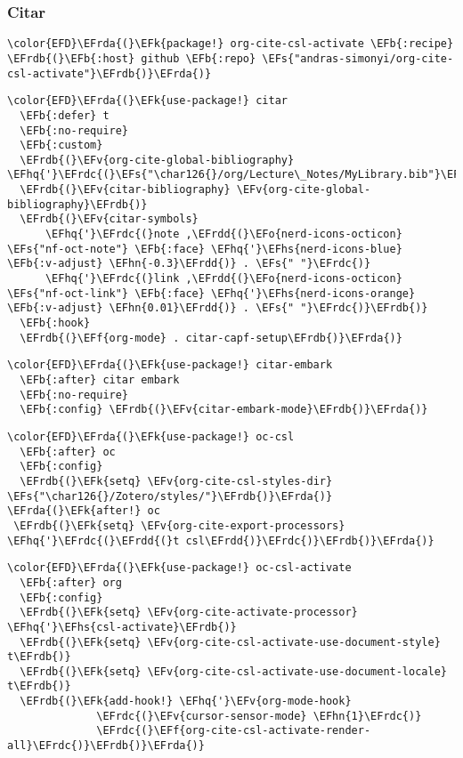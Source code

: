 \documentclass[12pt]{article}
\theoremstyle{plain}%
\theoremstyle{definition}
\theoremstyle{remark}
\newcommand{\EFs}[1]{\textcolor{EFs}{#1}} %
\newcommand{\EFk}[1]{\textcolor{EFk}{#1}} %
\newcommand{\EFb}[1]{\textcolor{EFb}{#1}} %
\newcommand{\EFf}[1]{\textcolor{EFf}{#1}} %
\newcommand{\EFv}[1]{\textcolor{EFv}{#1}} %
\newcommand{\EFo}[1]{\textcolor{EFo}{#1}} %
\newcommand{\EFhn}[1]{\textcolor{EFhn}{\textbf{#1}}} %
\newcommand{\EFhq}[1]{\textcolor{EFhq}{#1}} %
\newcommand{\EFhs}[1]{\textcolor{EFhs}{#1}} %
\newcommand{\EFrda}[1]{\textcolor{EFrda}{#1}} %
\newcommand{\EFrdb}[1]{\textcolor{EFrdb}{#1}} %
\newcommand{\EFrdc}[1]{\textcolor{EFrdc}{#1}} %
\newcommand{\EFrdd}[1]{\textcolor{EFrdd}{#1}} %
\begin{document}
\subsubsection{Citar}
\label{sec:org099b745}
\begin{Code}
\begin{Verbatim}
\color{EFD}\EFrda{(}\EFk{package!} org-cite-csl-activate \EFb{:recipe} \EFrdb{(}\EFb{:host} github \EFb{:repo} \EFs{"andras-simonyi/org-cite-csl-activate"}\EFrdb{)}\EFrda{)}
\end{Verbatim}
\end{Code}
\begin{Code}
\begin{Verbatim}
\color{EFD}\EFrda{(}\EFk{use-package!} citar
  \EFb{:defer} t
  \EFb{:no-require}
  \EFb{:custom}
  \EFrdb{(}\EFv{org-cite-global-bibliography} \EFhq{'}\EFrdc{(}\EFs{"\char126{}/org/Lecture\_Notes/MyLibrary.bib"}\EFrdc{)}\EFrdb{)}
  \EFrdb{(}\EFv{citar-bibliography} \EFv{org-cite-global-bibliography}\EFrdb{)}
  \EFrdb{(}\EFv{citar-symbols}
      \EFhq{'}\EFrdc{(}note ,\EFrdd{(}\EFo{nerd-icons-octicon} \EFs{"nf-oct-note"} \EFb{:face} \EFhq{'}\EFhs{nerd-icons-blue} \EFb{:v-adjust} \EFhn{-0.3}\EFrdd{)} . \EFs{" "}\EFrdc{)}
      \EFhq{'}\EFrdc{(}link ,\EFrdd{(}\EFo{nerd-icons-octicon} \EFs{"nf-oct-link"} \EFb{:face} \EFhq{'}\EFhs{nerd-icons-orange} \EFb{:v-adjust} \EFhn{0.01}\EFrdd{)} . \EFs{" "}\EFrdc{)}\EFrdb{)}
  \EFb{:hook}
  \EFrdb{(}\EFf{org-mode} . citar-capf-setup\EFrdb{)}\EFrda{)}
\end{Verbatim}
\end{Code}
\begin{Code}
\begin{Verbatim}
\color{EFD}\EFrda{(}\EFk{use-package!} citar-embark
  \EFb{:after} citar embark
  \EFb{:no-require}
  \EFb{:config} \EFrdb{(}\EFv{citar-embark-mode}\EFrdb{)}\EFrda{)}
\end{Verbatim}
\end{Code}
\begin{Code}
\begin{Verbatim}
\color{EFD}\EFrda{(}\EFk{use-package!} oc-csl
  \EFb{:after} oc
  \EFb{:config}
  \EFrdb{(}\EFk{setq} \EFv{org-cite-csl-styles-dir} \EFs{"\char126{}/Zotero/styles/"}\EFrdb{)}\EFrda{)}
\EFrda{(}\EFk{after!} oc
 \EFrdb{(}\EFk{setq} \EFv{org-cite-export-processors} \EFhq{'}\EFrdc{(}\EFrdd{(}t csl\EFrdd{)}\EFrdc{)}\EFrdb{)}\EFrda{)}

\end{Verbatim}
\end{Code}
\begin{Code}
\begin{Verbatim}
\color{EFD}\EFrda{(}\EFk{use-package!} oc-csl-activate
  \EFb{:after} org
  \EFb{:config}
  \EFrdb{(}\EFk{setq} \EFv{org-cite-activate-processor} \EFhq{'}\EFhs{csl-activate}\EFrdb{)}
  \EFrdb{(}\EFk{setq} \EFv{org-cite-csl-activate-use-document-style} t\EFrdb{)}
  \EFrdb{(}\EFk{setq} \EFv{org-cite-csl-activate-use-document-locale} t\EFrdb{)}
  \EFrdb{(}\EFk{add-hook!} \EFhq{'}\EFv{org-mode-hook}
              \EFrdc{(}\EFv{cursor-sensor-mode} \EFhn{1}\EFrdc{)}
              \EFrdc{(}\EFf{org-cite-csl-activate-render-all}\EFrdc{)}\EFrdb{)}\EFrda{)}

\end{Verbatim}
\end{Code}
\end{document}
